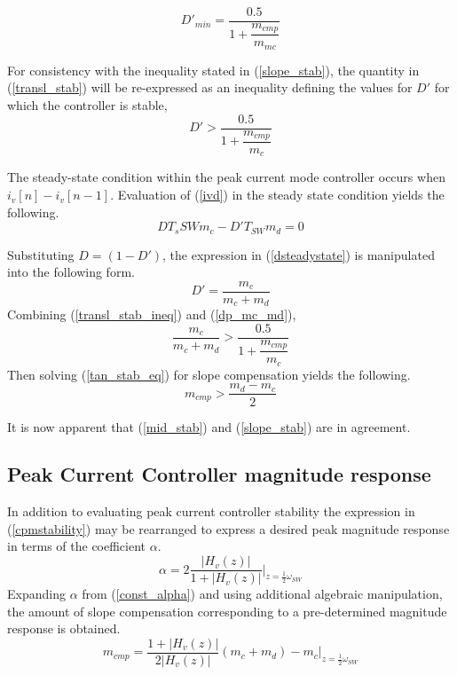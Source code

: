 \documentclass[conference]{IEEEtran}
\begin{document}
\begin{equation}
D'_{min} = \dfrac{0.5}{1 + \dfrac{m_{cmp}}{m_{mc}}} \label{transl_stab}
\end{equation}

For consistency with the inequality stated in (\ref{slope_stab}), the quantity in (\ref{transl_stab}) will be re-expressed as an inequality defining the values for $D'$ for which the controller is stable,
\begin{equation}
D' > \dfrac{0.5}{1 + \dfrac{m_{cmp}}{m_{c}}} \label{transl_stab_ineq}
\end{equation}

The steady-state condition within the peak current mode controller occurs when $i_v[n] - i_v[n-1]$. Evaluation of (\ref{ivd}) in the steady state condition yields the following.
\begin{equation}
	D T_s{SW} m_c - D' T_{SW} m_d = 0 \label{dsteadystate}
\end{equation}

Substituting $D = (1-D')$, the expression in (\ref{dsteadystate}) is manipulated into the following form.
\begin{equation}
	D' = \dfrac{m_c}{m_c+m_d} \label{dp_mc_md}
\end{equation}
Combining (\ref{transl_stab_ineq}) and (\ref{dp_mc_md}),
\begin{equation}
	\dfrac{m_c}{m_c + m_d} > \dfrac{0.5}{1 + \dfrac{m_{cmp}}{m_c}} \label{tan_stab_eq}
\end{equation}
Then solving (\ref{tan_stab_eq}) for slope compensation yields the following.
\begin{equation}
	m_{cmp} > \dfrac{m_d - m_c}{2} \label{mid_stab}
\end{equation}

It is now apparent that (\ref{mid_stab}) and (\ref{slope_stab}) are in agreement.

\subsection{Peak Current Controller magnitude response}
In addition to evaluating peak current controller stability the expression in (\ref{cpmstability}) may be rearranged to express a desired peak magnitude response in terms of the coefficient $\alpha$.
\begin{equation}
	\alpha =  2 \frac{|H_v(z)|}{1 + |H_v(z)|} \bigg|_{z=\frac{1}{2}\omega_{SW}} 
\end{equation}
Expanding $\alpha$ from (\ref{const_alpha}) and using additional algebraic manipulation, the amount of slope compensation corresponding to a pre-determined magnitude response is obtained.
\begin{equation}
	m_{cmp} = \frac{1 + |H_v(z)|}{2|H_v(z)|}(m_c + m_d) - m_c \bigg|_{z=\frac{1}{2}\omega_{SW}}
\end{equation}
\end{document}
